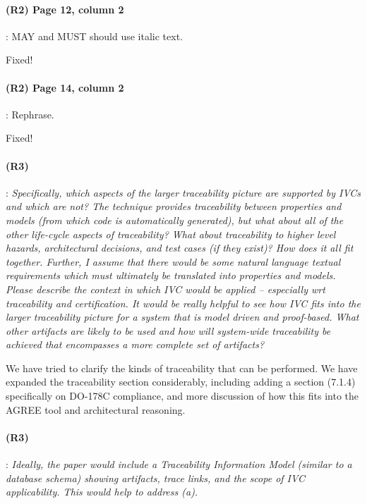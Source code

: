 \documentclass{article}
\begin{document}
\paragraph{(R2) Page 12, column 2} : MAY and MUST should use italic text.
\vspace{0.05in}

Fixed!

\paragraph{(R2) Page 14, column 2} : Rephrase.
\vspace{0.05in}

Fixed!

\paragraph{(R3)} :
\textit{Specifically, which aspects of the larger traceability picture are supported by IVCs and which are not? The technique provides traceability between properties and models (from which code is automatically generated), but what about all of the other life-cycle aspects of traceability? What about traceability to higher level hazards, architectural decisions, and test cases (if they exist)? How does it all fit together. Further, I assume that there would be some natural language textual requirements which must ultimately be translated into properties and models.       Please describe the context in which IVC would be applied -- especially wrt traceability and certification. It would be really helpful to see how IVC fits into the larger traceability picture for a system that is model driven and proof-based. What other artifacts are likely to be used and how will system-wide traceability be achieved that encompasses a more complete set of artifacts?}
\vspace{0.05in}

We have tried to clarify the kinds of traceability that can be performed.  We have expanded the traceability section considerably, including adding a section (7.1.4) specifically on DO-178C compliance, and more discussion of how this fits into the AGREE tool and architectural reasoning.

\paragraph{(R3)}:
\textit{Ideally, the paper would include a Traceability Information Model (similar to a database schema) showing artifacts, trace links, and the scope of IVC applicability. This would help to address (a).}
\vspace{0.05in}
\end{document}
